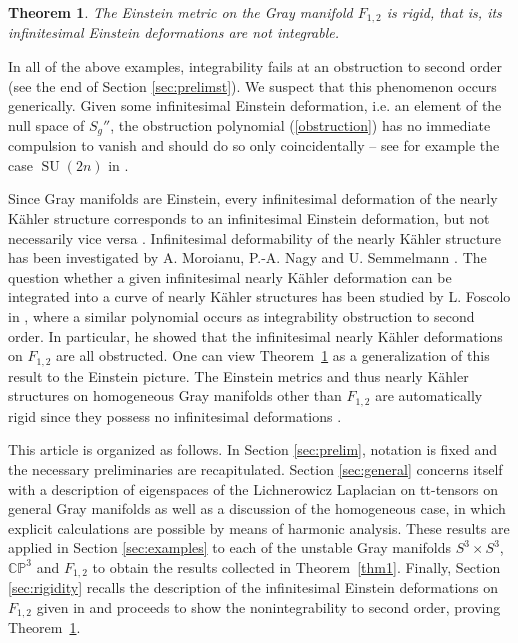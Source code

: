 \documentclass[12pt]{scrartcl}
\theoremstyle{plain}
\newtheorem{satz}{Theorem}[section]
\theoremstyle{definition}
\newcommand{\CP}{\mathbb{CP}}%
\newcommand{\SU}{\operatorname{SU}}%
\begin{document}
\begin{satz}\label{thm2}
The Einstein metric on the Gray manifold $F_{1,2}$ is rigid, that is, its infinitesimal Einstein deformations are not integrable.
\end{satz}

In all of the above examples, integrability fails at an obstruction to second order (see the end of Section \ref{sec:prelimst}). We suspect that this phenomenon occurs generically. Given some infinitesimal Einstein deformation, i.e. an element of the null space of $S_g''$, the obstruction polynomial (\ref{obstruction}) has no immediate compulsion to vanish and should do so only coincidentally -- see for example the case $\SU(2n)$ in \cite{sunrigidity}.

Since Gray manifolds are Einstein, every infinitesimal deformation of the nearly Kähler structure corresponds to an infinitesimal Einstein deformation, but not necessarily vice versa \cite{nearlykaehler}. Infinitesimal deformability of the nearly Kähler structure has been investigated by A. Moroianu, P.-A. Nagy and U. Semmelmann \cite{nkdeformations}. The question whether a given infinitesimal nearly Kähler deformation can be integrated into a curve of nearly Kähler structures has been studied by L. Foscolo in \cite{foscolo}, where a similar polynomial occurs as integrability obstruction to second order. In particular, he showed that the infinitesimal nearly Kähler deformations on $F_{1,2}$ are all obstructed. One can view Theorem~\ref{thm2} as a generalization of this result to the Einstein picture. The Einstein metrics and thus nearly Kähler structures on homogeneous Gray manifolds other than $F_{1,2}$ are automatically rigid since they possess no infinitesimal deformations \cite{nearlykaehler}.

This article is organized as follows. In Section \ref{sec:prelim}, notation is fixed and the necessary preliminaries are recapitulated. Section \ref{sec:general} concerns itself with a description of eigenspaces of the Lichnerowicz Laplacian on tt-tensors on general Gray manifolds as well as a discussion of the homogeneous case, in which explicit calculations are possible by means of harmonic analysis. These results are applied in Section \ref{sec:examples} to each of the unstable Gray manifolds $S^3\times S^3$, $\CP^3$ and $F_{1,2}$ to obtain the results collected in Theorem~\ref{thm1}. Finally, Section \ref{sec:rigidity} recalls the description of the infinitesimal Einstein deformations on $F_{1,2}$ given in \cite{hermitianlaplace} and proceeds to show the nonintegrability to second order, proving Theorem~\ref{thm2}.
\end{document}
